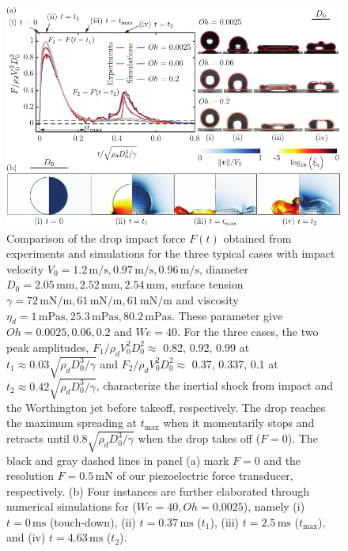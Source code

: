 \documentclass{jfm}
\newcommand{\oo}{\color{magenta} \normalfont}
\begin{document}
\begin{figure}
	\centering
	\includegraphics[width=\textwidth]{Figures/Figure1_summary_v6.pdf}
	\caption{{\oo Comparison of the drop impact force $F(t)$ obtained from experiments and simulations for the three typical cases with impact velocity $V_0 = 1.2\,\si{\meter}/\si{\second}, 0.97\,\si{\meter}/\si{\second}, 0.96\,\si{\meter}/\si{\second}$, diameter $D_0 = 2.05\,\si{\milli\meter}, 2.52\,\si{\milli\meter}, 2.54\,\si{\milli\meter}$, surface tension $\gamma = 72\,\si{\milli\newton}/\si{\meter}, 61\,\si{\milli\newton}/\si{\meter}, 61\,\si{\milli\newton}/\si{\meter}$ and viscosity $\eta_d = 1\,\si{\milli\pascal\second}, 25.3\,\si{\milli\pascal\second}, 80.2\,\si{\milli\pascal\second}$. These parameter give $Oh = 0.0025, 0.06, 0.2$ and $We = 40$.
	For the three cases, the two peak amplitudes, $F_1/\rho_dV_0^2D_0^2 \approx$ 0.82, 0.92, 0.99 at $t_1 \approx 0.03\sqrt{\rho_dD_0^3/\gamma}$ and $F_2/\rho_dV_0^2D_0^2 \approx$ 0.37, 0.337, 0.1 at $t_2 \approx 0.42\sqrt{\rho_dD_0^3/\gamma}$, characterize the inertial shock from impact and the Worthington jet before takeoff, respectively. 
	The drop reaches the maximum spreading at $t_{\text{max}}$ when it momentarily stops and retracts until $0.8\sqrt{\rho_dD_0^3/\gamma}$ when the drop takes off ($F = 0$). The black and gray dashed lines in panel (a) mark $F = 0$ and the resolution $F = 0.5\,\si{\milli\newton}$ of our piezoelectric force transducer, respectively.
	(b) Four instances are further elaborated through numerical simulations for ($We = 40, Oh = 0.0025$), namely (i) $t = 0\,\si{\milli\second}$ (touch-down), (ii) $t = 0.37\,\si{\milli\second}$ ($t_1$), (iii) $t = 2.5\,\si{\milli\second}$ ($t_{\text{max}}$), and (iv) $t = 4.63\,\si{\milli\second}$ ($t_2$).
}}
\end{figure}
\end{document}
